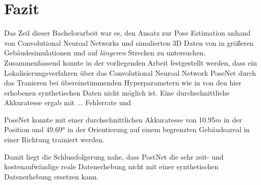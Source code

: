 
\section{Fazit}
\label{sec:kapitel_6}
Das Zeil dieser Bachelorarbeit war es, den Ansatz zur Pose Estimation anhand von Convolutional Neuroal Networks und simulierten 3D Daten von \citet{acharyaBIMPoseNetIndoorCamera2019} in größeren Gebäudesimulationen und auf \textit{längeren} Strecken zu untersuchen.
Zusammenfassend konnte in der vorliegenden Arbeit festgestellt werden, dass ein Lokalisierungsverfahren über das Convolutional Neuroal Network PoseNet durch das Tranieren bei übereinstimmenden Hyperparametern wie in \cite{acharyaBIMPoseNetIndoorCamera2019} von den hier erhobenen synthetischen Daten nicht möglich ist. Eine durchschnittliche Akkuratesse ergab mit ... Fehlerrate und 

PoseNet konnte mit einer durchschnittlichen Akkuratesse von 10.95$m$ in der Position und 49.69° in der Orientierung auf einem begrenzten Gebäudeareal in einer Richtung trainiert werden.

Damit liegt die Schlussfolgerung nahe, dass PostNet die sehr zeit- und kostenaufwändige reale Datenerhebung nicht mit einer synthetischen Datenerhebung ersetzen kann.
